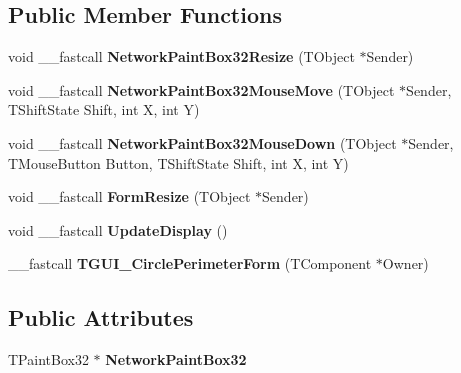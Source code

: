 \subsection*{Public Member Functions}
\begin{DoxyCompactItemize}
\item 
\hypertarget{class_t_g_u_i___circle_perimeter_form_af3f4ebc377bfe8579df4930231dd1347}{void \+\_\+\+\_\+fastcall {\bfseries Network\+Paint\+Box32\+Resize} (T\+Object $\ast$Sender)}\label{class_t_g_u_i___circle_perimeter_form_af3f4ebc377bfe8579df4930231dd1347}

\item 
\hypertarget{class_t_g_u_i___circle_perimeter_form_a346821eafb1cc000599d8d4250f97eb8}{void \+\_\+\+\_\+fastcall {\bfseries Network\+Paint\+Box32\+Mouse\+Move} (T\+Object $\ast$Sender, T\+Shift\+State Shift, int X, int Y)}\label{class_t_g_u_i___circle_perimeter_form_a346821eafb1cc000599d8d4250f97eb8}

\item 
\hypertarget{class_t_g_u_i___circle_perimeter_form_ad128d4a37e760d74ebf3091373f3e15e}{void \+\_\+\+\_\+fastcall {\bfseries Network\+Paint\+Box32\+Mouse\+Down} (T\+Object $\ast$Sender, T\+Mouse\+Button Button, T\+Shift\+State Shift, int X, int Y)}\label{class_t_g_u_i___circle_perimeter_form_ad128d4a37e760d74ebf3091373f3e15e}

\item 
\hypertarget{class_t_g_u_i___circle_perimeter_form_aaf875daddf65d68acbc074572ee68596}{void \+\_\+\+\_\+fastcall {\bfseries Form\+Resize} (T\+Object $\ast$Sender)}\label{class_t_g_u_i___circle_perimeter_form_aaf875daddf65d68acbc074572ee68596}

\item 
\hypertarget{class_t_g_u_i___circle_perimeter_form_a09c17990b6741e8455269108ae9f1fa1}{void \+\_\+\+\_\+fastcall {\bfseries Update\+Display} ()}\label{class_t_g_u_i___circle_perimeter_form_a09c17990b6741e8455269108ae9f1fa1}

\item 
\hypertarget{class_t_g_u_i___circle_perimeter_form_ab0bae18e143aeae8728a1cf97f6830b7}{\+\_\+\+\_\+fastcall {\bfseries T\+G\+U\+I\+\_\+\+Circle\+Perimeter\+Form} (T\+Component $\ast$Owner)}\label{class_t_g_u_i___circle_perimeter_form_ab0bae18e143aeae8728a1cf97f6830b7}

\end{DoxyCompactItemize}
\subsection*{Public Attributes}
\begin{DoxyCompactItemize}
\item 
\hypertarget{class_t_g_u_i___circle_perimeter_form_a3f189488faa245c4f4fbe5983c5a24e6}{T\+Paint\+Box32 $\ast$ {\bfseries Network\+Paint\+Box32}}\label{class_t_g_u_i___circle_perimeter_form_a3f189488faa245c4f4fbe5983c5a24e6}

\end{DoxyCompactItemize}


